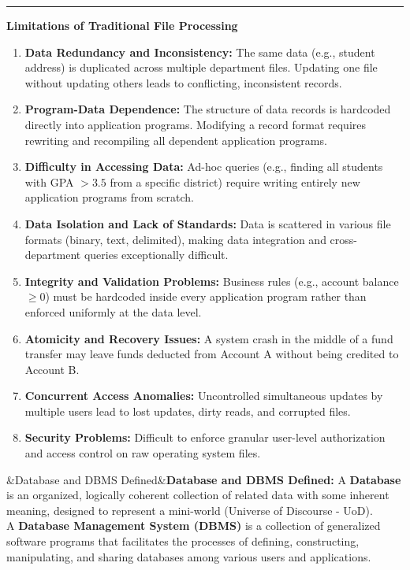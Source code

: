 \documentclass[11pt,a4paper]{article}
\newcommand{\concept}[1]{%
  \vspace{3pt}\noindent\textcolor{AnthGreen}{\rule{3.5pt}{10pt}}\enspace
  \textbf{\sffamily\color{AnthDark}#1}\par\vspace{2pt}%
}
\newenvironment{Def}[1][]{\begin{tcolorbox}[defbox]\ifx&#1&\else\textbf{\color{AnthOrange}#1:}\enspace\fi}{\end{tcolorbox}}
\begin{document}
\concept{Limitations of Traditional File Processing}
\begin{enumerate}
  \item \textbf{Data Redundancy and Inconsistency:} The same data (e.g., student address) is duplicated across multiple department files. Updating one file without updating others leads to conflicting, inconsistent records.
  \item \textbf{Program-Data Dependence:} The structure of data records is hardcoded directly into application programs. Modifying a record format requires rewriting and recompiling all dependent application programs.
  \item \textbf{Difficulty in Accessing Data:} Ad-hoc queries (e.g., finding all students with GPA $> 3.5$ from a specific district) require writing entirely new application programs from scratch.
  \item \textbf{Data Isolation and Lack of Standards:} Data is scattered in various file formats (binary, text, delimited), making data integration and cross-department queries exceptionally difficult.
  \item \textbf{Integrity and Validation Problems:} Business rules (e.g., account balance $\ge 0$) must be hardcoded inside every application program rather than enforced uniformly at the data level.
  \item \textbf{Atomicity and Recovery Issues:} A system crash in the middle of a fund transfer may leave funds deducted from Account A without being credited to Account B.
  \item \textbf{Concurrent Access Anomalies:} Uncontrolled simultaneous updates by multiple users lead to lost updates, dirty reads, and corrupted files.
  \item \textbf{Security Problems:} Difficult to enforce granular user-level authorization and access control on raw operating system files.
\end{enumerate}

\begin{Def}[Database and DBMS Defined]
A \textbf{Database} is an organized, logically coherent collection of related data with some inherent meaning, designed to represent a mini-world (Universe of Discourse - UoD).\\
A \textbf{Database Management System (DBMS)} is a collection of generalized software programs that facilitates the processes of defining, constructing, manipulating, and sharing databases among various users and applications.
\end{Def}
\end{document}
